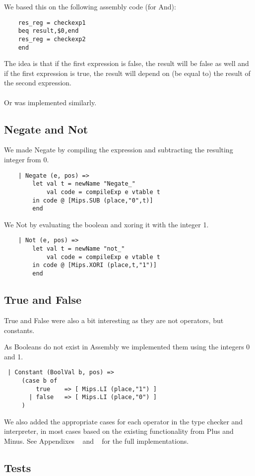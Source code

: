 \documentclass{article}
\begin{document}
\noindent We based this on the following assembly code (for And):
\begin{lstlisting}
    res_reg = checkexp1
    beq result,$0,end
    res_reg = checkexp2
    end
\end{lstlisting}
The idea is that if the first expression is false, the result will be false as well and if the first expression is true, the result will depend on (be equal to) the result of the second expression.\\
\\
Or was implemented similarly.
\subsection{Negate and Not}
We made Negate by compiling the expression and subtracting the resulting integer from 0.
\begin{lstlisting}
    | Negate (e, pos) =>
        let val t = newName "Negate_"
            val code = compileExp e vtable t
        in code @ [Mips.SUB (place,"0",t)]
        end
\end{lstlisting}
We Not by evaluating the boolean and xoring it with the integer 1.
\begin{lstlisting}
    | Not (e, pos) =>
        let val t = newName "not_"
            val code = compileExp e vtable t
        in code @ [Mips.XORI (place,t,"1")]
        end
\end{lstlisting}

\subsection{True and False}
True and False were also a bit interesting as they are not operators, but constants.

\noindent As Booleans do not exist in Assembly we implemented them using the integers 0 and 1.
\begin{lstlisting}
 | Constant (BoolVal b, pos) => 
     (case b of
         true    => [ Mips.LI (place,"1") ]
       | false   => [ Mips.LI (place,"0") ]
     )
\end{lstlisting}

We also added the appropriate cases for each operator in the type checker and interpreter, in most cases based on the existing functionality from Plus and Minus.
See Appendixes ~ and ~ for the full implementations.

\subsection{Tests}
\end{document}
